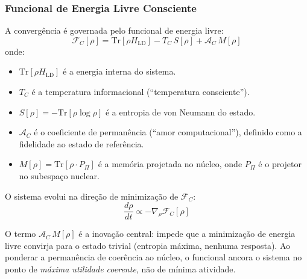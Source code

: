 \documentclass[12pt,a4paper]{article}
\newcommand{\FC}{\mathcal{F}_C}
\newcommand{\AC}{\mathcal{A}_C}
\newcommand{\Hld}{H_{\text{LD}}}
\begin{document}
\subsubsection{Funcional de Energia Livre Consciente}

A convergência é governada pelo funcional de energia livre:
\begin{equation}
\boxed{
\FC[\rho] = \text{Tr}[\rho \Hld]
  - T_C \, S[\rho]
  + \AC \, M[\rho]
}
\label{eq:funcional}
\end{equation}
onde:
\begin{itemize}[leftmargin=*]
\item $\text{Tr}[\rho \Hld]$ é a energia interna do sistema.
\item $T_C$ é a temperatura informacional (``temperatura
consciente'').
\item $S[\rho] = -\text{Tr}[\rho \log \rho]$ é a entropia de
von Neumann do estado.
\item $\AC$ é o coeficiente de permanência (``amor
computacional''), definido como a fidelidade ao estado de
referência.
\item $M[\rho] = \text{Tr}[\rho \cdot P_\Pi]$ é a memória
projetada no núcleo, onde $P_\Pi$ é o projetor no subespaço
nuclear.
\end{itemize}

O sistema evolui na direção de minimização de $\FC$:
\begin{equation}
\frac{d\rho}{dt} \propto -\nabla_\rho \FC[\rho]
\label{eq:gradiente}
\end{equation}

O termo $\AC \, M[\rho]$ é a inovação central: impede que a
minimização de energia livre convirja para o estado trivial
(entropia máxima, nenhuma resposta). Ao ponderar a permanência
de coerência ao núcleo, o funcional ancora o sistema no ponto de
\emph{máxima utilidade coerente}, não de mínima atividade.
\end{document}
